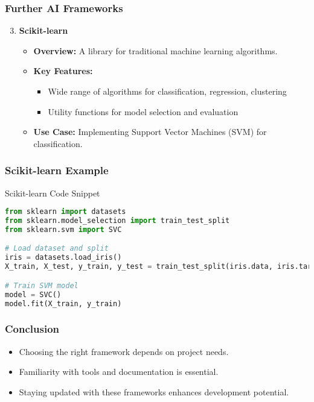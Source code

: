 \documentclass[aspectratio=169]{beamer}
\begin{document}
\begin{frame}
    \frametitle{Further AI Frameworks}
    \begin{enumerate}
        \setcounter{enumi}{2}
        \item \textbf{Scikit-learn}
            \begin{itemize}
                \item \textbf{Overview:} A library for traditional machine learning algorithms.
                \item \textbf{Key Features:}
                    \begin{itemize}
                        \item Wide range of algorithms for classification, regression, clustering
                        \item Utility functions for model selection and evaluation
                    \end{itemize}
                \item \textbf{Use Case:} Implementing Support Vector Machines (SVM) for classification.
            \end{itemize}
    \end{enumerate}
\end{frame}

\begin{frame}[fragile]
    \frametitle{Scikit-learn Example}
    \begin{block}{Scikit-learn Code Snippet}
    \begin{lstlisting}[language=Python]
from sklearn import datasets
from sklearn.model_selection import train_test_split
from sklearn.svm import SVC

# Load dataset and split
iris = datasets.load_iris()
X_train, X_test, y_train, y_test = train_test_split(iris.data, iris.target, test_size=0.2)

# Train SVM model
model = SVC()
model.fit(X_train, y_train)
    \end{lstlisting}
    \end{block}
\end{frame}

\begin{frame}
    \frametitle{Conclusion}
    \begin{itemize}
        \item Choosing the right framework depends on project needs.
        \item Familiarity with tools and documentation is essential.
        \item Staying updated with these frameworks enhances development potential.
    \end{itemize}
\end{frame}
\end{document}
